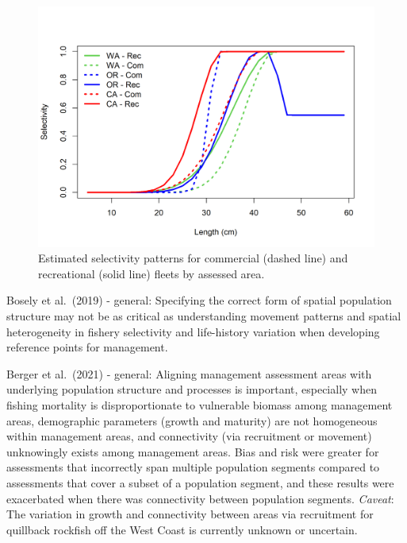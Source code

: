 \documentclass[11pt,
  english,
  letterpaper,
]{article}
\begin{document}
\begin{figure}
\centering
\includegraphics[width=1\textwidth,height=1\textheight]{comprare_selectivity.png}
\caption{Estimated selectivity patterns for commercial (dashed line) and recreational (solid line) fleets by assessed area.\label{fig:selectivity-comparison}}
\end{figure}

\tagmcend\tagstructend

\clearpage


Bosely et al.~{(2019)\leavevmode\tagmcend\tagstructend} - general: Specifying the correct form of spatial population structure may not be as critical as understanding movement patterns and spatial heterogeneity in fishery selectivity and life-history variation when developing reference points for management.

\leavevmode\tagmcend\tagstructend\par


Berger et al.~{(2021)\leavevmode\tagmcend\tagstructend} - general: Aligning management assessment areas with underlying population structure and processes is important, especially when fishing mortality is disproportionate to vulnerable biomass among management areas, demographic parameters (growth and maturity) are not homogeneous within management areas, and connectivity (via recruitment or movement) unknowingly exists among management areas. Bias and risk were greater for assessments that incorrectly span multiple population segments compared to assessments that cover a subset of a population segment, and these results were exacerbated when there was connectivity between population segments. \emph{Caveat}: The variation in growth and connectivity between areas via recruitment for quillback rockfish off the West Coast is currently unknown or uncertain.
\end{document}
